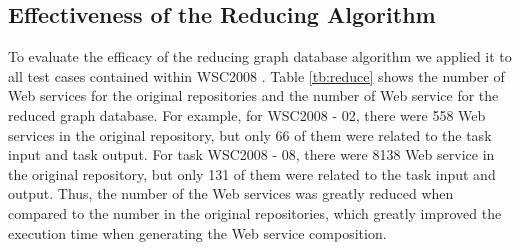 \subsection{Effectiveness of the Reducing Algorithm} 
To evaluate the efficacy of the reducing graph database algorithm we applied it to all test cases contained within WSC2008 \cite{12}.  Table \ref{tb:reduce} shows the number of Web services for the original repositories and the number of Web service for the reduced graph database. For example, for WSC2008 - 02, there were 558 Web services in the original repository, but only 66 of them were related to the task input and task output. For task WSC2008 - 08, there were 8138 Web service in the original repository, but only 131 of them were related to the task input and output. Thus, the number of the Web services was greatly reduced when compared to the number in the original repositories, which greatly improved the execution time when generating the Web service composition.

\begin{table}[]
\centering
\caption{Comparison of the number of services in the original repositories and the reduced repositories}
\label{tb:reduce}
\end{table}

